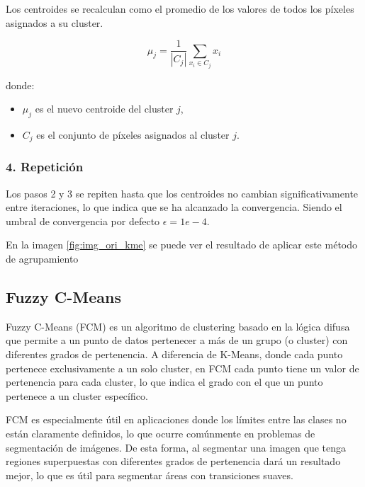 Los centroides se recalculan como el promedio de los valores de todos los píxeles asignados a su cluster.

$$\mu_j =\frac{1}{|C_j |}\sum_{x_i \in C_j } x_i$$

donde:

\begin{itemize}
\setlength{\itemsep}{-1ex}
   \item{\begin{flushleft} $\mu_j$ es el nuevo centroide del cluster $j$, \end{flushleft}}
   \item{\begin{flushleft} $C_j$ es el conjunto de píxeles asignados al cluster $j$. \end{flushleft}}
\end{itemize}

\subsubsection{4. Repetición}

Los pasos 2 y 3 se repiten hasta que los centroides no cambian significativamente entre iteraciones, lo que indica que se ha alcanzado la convergencia. Siendo el umbral de convergencia por defecto $\epsilon =1e-4$.

En la imagen \ref{fig:img_ori_kme} se puede ver el resultado de aplicar este método de agrupamiento

\subsection{Fuzzy C-Means}\label{fuzzy-c-means}
Fuzzy C-Means (FCM) \cite{MATLAB:2023bFuzzy} es un algoritmo de clustering basado en la lógica difusa que permite a un punto de datos pertenecer a más de un grupo (o cluster) con diferentes grados de pertenencia. A diferencia de K-Means, donde cada punto pertenece exclusivamente a un solo cluster, en FCM cada punto tiene un valor de pertenencia para cada cluster, lo que indica el grado con el que un punto pertenece a un cluster específico.

FCM es especialmente útil en aplicaciones donde los límites entre las clases no están claramente definidos, lo que ocurre comúnmente en problemas de segmentación de imágenes. De esta forma, al segmentar una imagen que tenga regiones superpuestas con diferentes grados de pertenencia dará un resultado mejor, lo que es útil para segmentar áreas con transiciones suaves.


